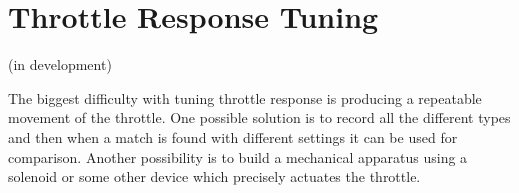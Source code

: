 \documentclass{article}
\begin{document}
\section{Throttle Response Tuning}
(in development)

The biggest difficulty with tuning throttle response is producing
a repeatable movement of the throttle.
One possible solution is to record all the different types and then
when a match is found with different settings it can be used for
comparison.
Another possibility is to build a mechanical apparatus using a solenoid
or some other device which precisely actuates the throttle.

\pagebreak

%
%
%


\end{document}
